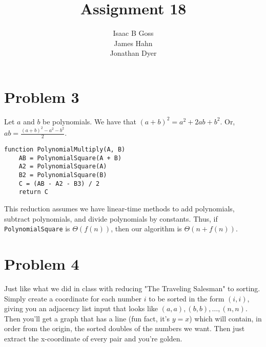 \documentclass{article}
\author{Isaac B Goss\\ James Hahn\\ Jonathan Dyer}
\title{Assignment 18}
\providecommand{\prob}[1]{\section*{Problem #1}}
\begin{document}
\maketitle
\prob{3}
Let $a$ and $b$ be polynomials.
We have that $(a+b)^2 = a^2 + 2ab + b^2$.
Or, $\displaystyle ab = \frac{(a+b)^2 - a^2 - b^2}{2}$.\\
\begin{lstlisting}
function PolynomialMultiply(A, B)
    AB = PolynomialSquare(A + B)
    A2 = PolynomialSquare(A)
    B2 = PolynomialSquare(B)
    C = (AB - A2 - B3) / 2
    return C
\end{lstlisting}

This reduction assumes we have linear-time methods to add polynomials, subtract polynomials, and divide polynomials by constants.
Thus, if \texttt{PolynomialSquare} is $\Theta(f(n))$, then our algorithm is $\Theta(n + f(n))$.


\prob{4}
Just like what we did in class with reducing "The Traveling Salesman" to sorting. 
Simply create a coordinate for each number $i$ to be sorted in the form $(i,i)$, 
giving you an adjacency list input that looks like $(a,a),(b,b), \dots, (n,n)$.
Then you'll get a graph that has a line (fun fact, it's $y=x$) which will contain, 
in order from the origin, the sorted doubles of the numbers we want.
Then just extract the x-coordinate of every pair and you're golden.
\end{document}
